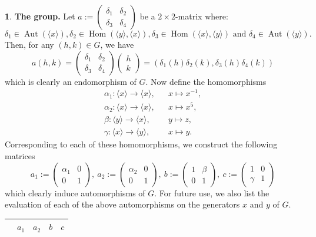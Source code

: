 \documentclass[12pt]{article}
\theoremstyle{plain}
\theoremstyle{definition}
\newtheorem{nothing}[theorem]{}
\newcommand{\Hom}{\operatorname{Hom}}
\newcommand{\Aut}{\operatorname{Aut}}
\begin{document}
\begin{nothing} {\textbf{The group.}}
Let  $a:= \begin{pmatrix}
    \delta_1& \delta_2\\ \delta_3&\delta_4
\end{pmatrix}$ be a $2\times 2$-matrix where: 
\[\delta_1\in\Aut(\langle x\rangle), \delta_2\in\Hom(\langle y\rangle, \langle x\rangle), \delta_3\in \Hom(\langle x\rangle, \langle y\rangle) \text{ and } \delta_4\in\Aut(\langle y\rangle).\]
Then, for any $(h, k)\in G$, we have
\[
a(h, k) = \begin{pmatrix}
    \delta_1& \delta_2\\ \delta_3&\delta_4
\end{pmatrix}\begin{pmatrix}
    h\\ k
\end{pmatrix} = (\delta_1(h)\delta_2(k), \delta_3(h)\delta_4(k))
\]
which is clearly an endomorphism of $G$. Now define the homomorphisms
\begin{eqnarray*}
    \alpha_1 : \langle x\rangle \to \langle x\rangle, && x\mapsto x^{-1},\\
        \alpha_2 : \langle x\rangle \to \langle x\rangle, && x\mapsto x^{5},\\
    \beta : \langle y\rangle \to \langle x\rangle, && y\mapsto z,\\
    \gamma : \langle x\rangle \to \langle y\rangle, && x\mapsto y.
\end{eqnarray*}
Corresponding to each of these homomorphisms, we construct the following matrices
\[
a_1:= \begin{pmatrix}
    \alpha_1 & 0\\ 0& 1
\end{pmatrix},\ 
a_2:= \begin{pmatrix}
    \alpha_2& 0\\ 0&1
\end{pmatrix},\ 
b:= \begin{pmatrix}
    1& \beta\\ 0&1
\end{pmatrix},\ 
c:= \begin{pmatrix}
    1& 0\\ \gamma &1
\end{pmatrix}
\]
which clearly induce automorphisms of $G$. 
For future use, we also list the evaluation of each of the above automorphisms on the generators $x$ and $y$ of $G$.
\begin{center}
    \begin{tabular}{c|cccc}
         & $a_1$ & $a_2$ & $b$ & $c$ \\ \hline

\end{tabular}
\end{center}
\end{nothing}
\end{document}
